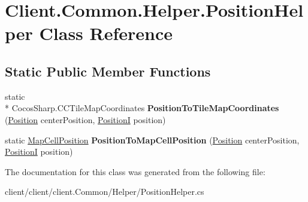 \hypertarget{classClient_1_1Common_1_1Helper_1_1PositionHelper}{\section{Client.\-Common.\-Helper.\-Position\-Helper Class Reference}
\label{classClient_1_1Common_1_1Helper_1_1PositionHelper}
}
\subsection*{Static Public Member Functions}
\begin{DoxyCompactItemize}
\item 
\hypertarget{classClient_1_1Common_1_1Helper_1_1PositionHelper_ac77b450a32ee660ee2c141cecbc08c0c}{static \\*
Cocos\-Sharp.\-C\-C\-Tile\-Map\-Coordinates {\bfseries Position\-To\-Tile\-Map\-Coordinates} (\hyperlink{classCore_1_1Models_1_1Position}{Position} center\-Position, \hyperlink{classCore_1_1Models_1_1PositionI}{Position\-I} position)}\label{classClient_1_1Common_1_1Helper_1_1PositionHelper_ac77b450a32ee660ee2c141cecbc08c0c}

\item 
\hypertarget{classClient_1_1Common_1_1Helper_1_1PositionHelper_af2ba9ab8c3c50e5f41ba5f4cd65ca013}{static \hyperlink{classClient_1_1Common_1_1Models_1_1MapCellPosition}{Map\-Cell\-Position} {\bfseries Position\-To\-Map\-Cell\-Position} (\hyperlink{classCore_1_1Models_1_1Position}{Position} center\-Position, \hyperlink{classCore_1_1Models_1_1PositionI}{Position\-I} position)}\label{classClient_1_1Common_1_1Helper_1_1PositionHelper_af2ba9ab8c3c50e5f41ba5f4cd65ca013}

\end{DoxyCompactItemize}


The documentation for this class was generated from the following file\-:\begin{DoxyCompactItemize}
\item 
client/client/client.\-Common/\-Helper/Position\-Helper.\-cs\end{DoxyCompactItemize}
